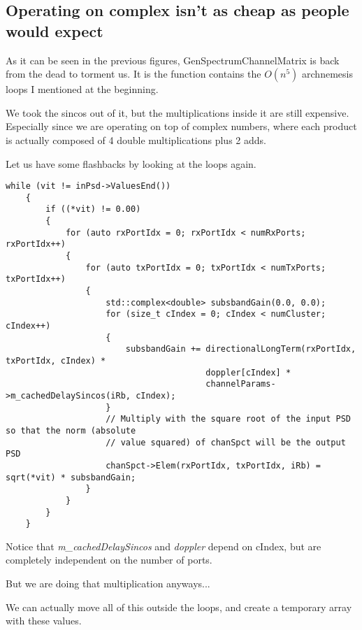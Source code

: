 \documentclass{article}
\begin{document}
\subsection{Operating on complex isn't as cheap as people would expect}

As it can be seen in the previous figures, GenSpectrumChannelMatrix is back
from the dead to torment us. It is the function contains the $O(n^5)$
archnemesis loops I mentioned at the beginning.

We took the sincos out of it, but the multiplications inside it are still
expensive. Especially since we are operating on top of complex numbers,
where each product is actually composed of 4 double multiplications plus 2 adds.

Let us have some flashbacks by looking at the loops again.

\begin{lstlisting}
while (vit != inPsd->ValuesEnd())
    {
        if ((*vit) != 0.00)
        {
            for (auto rxPortIdx = 0; rxPortIdx < numRxPorts; rxPortIdx++)
            {
                for (auto txPortIdx = 0; txPortIdx < numTxPorts; txPortIdx++)
                {
                    std::complex<double> subsbandGain(0.0, 0.0);
                    for (size_t cIndex = 0; cIndex < numCluster; cIndex++)
                    {
                        subsbandGain += directionalLongTerm(rxPortIdx, txPortIdx, cIndex) *
                                        doppler[cIndex] *
                                        channelParams->m_cachedDelaySincos(iRb, cIndex);
                    }
                    // Multiply with the square root of the input PSD so that the norm (absolute
                    // value squared) of chanSpct will be the output PSD
                    chanSpct->Elem(rxPortIdx, txPortIdx, iRb) = sqrt(*vit) * subsbandGain;
                }
            }
        }
    }
\end{lstlisting}

Notice that \emph{m\_cachedDelaySincos} and \emph{doppler} depend on cIndex,
but are completely independent on the number of ports.

But we are doing that multiplication anyways...

We can actually move all of this outside the loops, and create a temporary
array with these values.
\end{document}
